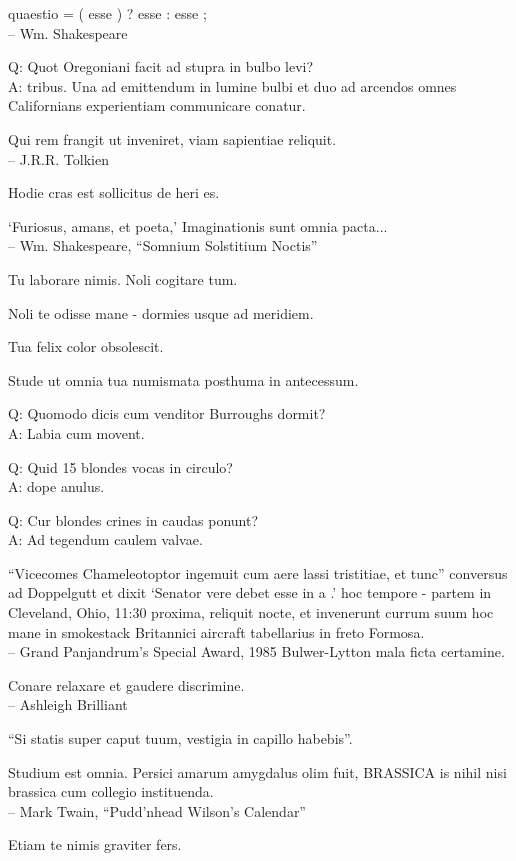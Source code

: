 \documentclass[titlepage,12pt]{memoir}
\begin{document}
quaestio = ( esse ) ? esse : esse ;
\\-- Wm. Shakespeare

Q: Quot Oregoniani facit ad stupra in bulbo levi?\\
A: tribus. Una ad emittendum in lumine bulbi et duo ad arcendos omnes
Californians experientiam communicare conatur.

Qui rem frangit ut inveniret, viam sapientiae reliquit.
\\-- J.R.R. Tolkien

Hodie cras est sollicitus de heri es.

‘Furiosus, amans, et poeta,’
Imaginationis sunt omnia pacta...
\\-- Wm. Shakespeare, “Somnium Solstitium Noctis”

Tu laborare nimis. Noli cogitare tum.

Noli te odisse mane - dormies usque ad meridiem.

Tua felix color obsolescit.

Stude ut omnia tua numismata posthuma in antecessum.

Q: Quomodo dicis cum venditor Burroughs dormit?\\
A: Labia cum movent.

Q: Quid 15 blondes vocas in circulo?\\
A: dope anulus.

Q: Cur blondes crines in caudas ponunt?\\
A: Ad tegendum caulem valvae.

“Vicecomes Chameleotoptor ingemuit cum aere lassi tristitiae, et tunc”
conversus ad Doppelgutt et dixit ‘Senator vere debet esse in a .’
hoc tempore - partem in Cleveland, Ohio, 11:30 proxima, reliquit
nocte, et invenerunt currum suum hoc mane in smokestack Britannici
aircraft tabellarius in freto Formosa.
\\-- Grand Panjandrum’s Special Award, 1985 Bulwer-Lytton
mala ficta certamine.

Conare relaxare et gaudere discrimine.
\\-- Ashleigh Brilliant

“Si statis super caput tuum, vestigia in capillo habebis”.

Studium est omnia. Persici amarum amygdalus olim fuit, BRASSICA is
nihil nisi brassica cum collegio instituenda.
\\-- Mark Twain, “Pudd’nhead Wilson’s Calendar”

Etiam te nimis graviter fers.
\end{document}
